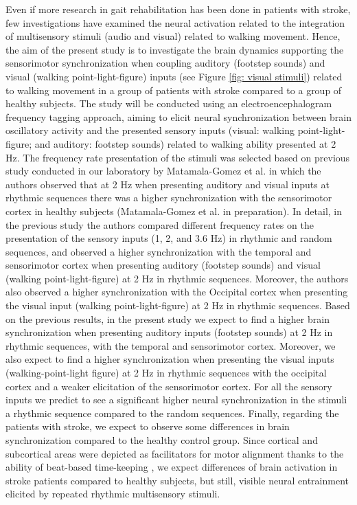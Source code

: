 Even if more research in gait rehabilitation has been done in patients with stroke, few investigations have examined the neural activation related to the integration of multisensory stimuli (audio and visual) related to walking movement. Hence, the aim of the present study is to investigate the brain dynamics supporting the sensorimotor synchronization when coupling auditory (footstep sounds) and visual (walking point-light-figure) inputs (see Figure \ref{fig: visual stimuli}) related to walking movement in a group of patients with stroke compared to a group of healthy subjects. 
The study will be conducted using an electroencephalogram frequency tagging approach, aiming to elicit neural synchronization between brain oscillatory activity and the presented sensory inputs (visual: walking point-light-figure; and auditory: footstep sounds) related to walking ability presented at 2 Hz. The frequency rate presentation of the stimuli was selected based on previous study conducted in our laboratory by Matamala-Gomez et al. in which the authors observed that at 2 Hz when presenting auditory and visual inputs at rhythmic sequences there was a higher synchronization with the sensorimotor cortex in healthy subjects (Matamala-Gomez et al. in preparation). In detail, in the previous study the authors compared different frequency rates on the presentation of the sensory inputs (1, 2, and 3.6 Hz) in rhythmic and random sequences, and observed a higher synchronization with the temporal and sensorimotor cortex when presenting auditory (footstep sounds) and visual (walking point-light-figure) at 2 Hz in rhythmic sequences. Moreover, the authors also observed a higher synchronization with the Occipital cortex when presenting the visual input (walking point-light-figure) at 2 Hz in rhythmic sequences. Based on the previous results, in the present study we expect to find a higher brain synchronization when presenting auditory inputs (footstep sounds) at 2 Hz in rhythmic sequences, with the temporal and sensorimotor cortex. Moreover, we also expect to find a higher synchronization when presenting the visual inputs (walking-point-light figure) at 2 Hz in rhythmic sequences with the occipital cortex and a weaker elicitation of the sensorimotor cortex. For all the sensory inputs we predict to see a significant higher neural synchronization in the stimuli a rhythmic sequence compared to the random sequences. 
Finally, regarding the patients with stroke, we expect to observe some differences in brain synchronization compared to the healthy control group. Since cortical and subcortical areas were depicted as facilitators for motor alignment thanks to the ability of beat-based time-keeping \parencite{Cannon_2021}, we expect differences of brain activation in stroke patients compared to healthy subjects, but still, visible neural entrainment elicited by repeated rhythmic multisensory stimuli.

